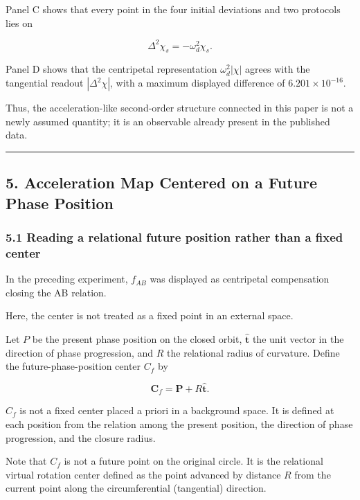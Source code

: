 \documentclass[
  a4paper,
]{article}
\begin{document}
Panel C shows that every point in the four initial deviations and two
protocols lies on

\[
\Delta^2\chi_s=-\omega_d^2\chi_s.
\]

Panel D shows that the centripetal representation \(\omega_d^2|\chi|\)
agrees with the tangential readout \(|\Delta^2\chi|\), with a maximum
displayed difference of \(6.201\times10^{-16}\).

Thus, the acceleration-like second-order structure connected in this
paper is not a newly assumed quantity; it is an observable already
present in the published data.

\begin{center}\rule{0.5\linewidth}{0.5pt}\end{center}

\subsection{5. Acceleration Map Centered on a Future Phase
Position}\label{acceleration-map-centered-on-a-future-phase-position}

\subsubsection{5.1 Reading a relational future position rather than a
fixed
center}\label{reading-a-relational-future-position-rather-than-a-fixed-center}

In the preceding experiment, \(f_{AB}\) was displayed as centripetal
compensation closing the AB relation.

Here, the center is not treated as a fixed point in an external space.

Let \(P\) be the present phase position on the closed orbit,
\(\hat{\boldsymbol t}\) the unit vector in the direction of phase
progression, and \(R\) the relational radius of curvature. Define the
future-phase-position center \(C_f\) by

\[
\boldsymbol C_f
=\boldsymbol P+R\hat{\boldsymbol t}.
\]

\(C_f\) is not a fixed center placed a priori in a background space. It
is defined at each position from the relation among the present
position, the direction of phase progression, and the closure radius.

Note that \(C_f\) is not a future point on the original circle. It is
the relational virtual rotation center defined as the point advanced by
distance \(R\) from the current point along the circumferential
(tangential) direction.
\end{document}
